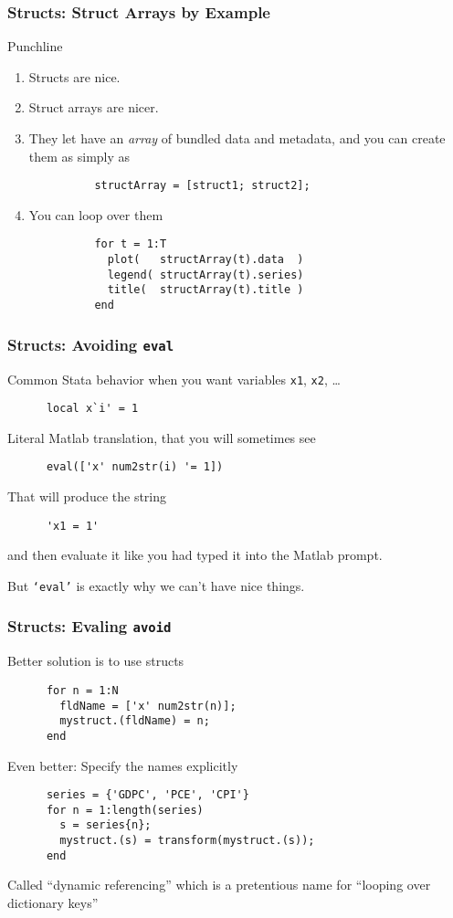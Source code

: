 \documentclass{beamer}
\begin{document}
  \begin{frame}[fragile]
    \frametitle{Structs: Struct Arrays by Example}

    Punchline
    \begin{enumerate}
      \item Structs are nice.
      \item Struct arrays are nicer.
      \item They let have an \emph{array} of bundled data and metadata,
        and you can create them as simply as
        \begin{lstlisting}
          structArray = [struct1; struct2];
        \end{lstlisting}
      \item You can loop over them
        \begin{lstlisting}
          for t = 1:T
            plot(   structArray(t).data  )
            legend( structArray(t).series)
            title(  structArray(t).title )
          end
        \end{lstlisting}
    \end{enumerate}
	\end{frame}

  \begin{frame}[fragile]
    \frametitle{Structs: Avoiding \texttt{eval}}

    Common Stata behavior when you want variables \texttt{x1},
    \texttt{x2}, \ldots
    \begin{lstlisting}
      local x`i' = 1
    \end{lstlisting}\pause
    Literal Matlab translation, that you will sometimes see
    \begin{lstlisting}
      eval(['x' num2str(i) '= 1])
    \end{lstlisting}\pause
    That will produce the string
    \begin{lstlisting}
      'x1 = 1'
    \end{lstlisting}
    and then evaluate it like you had typed it into the Matlab prompt.\pause

    \vspace{20pt}
    But \texttt{`eval'} is exactly why we can't have nice things.
	\end{frame}


  \begin{frame}[fragile]
    \frametitle{Structs: Evaling \texttt{avoid}}

    Better solution is to use structs
    \begin{lstlisting}
      for n = 1:N
        fldName = ['x' num2str(n)];
        mystruct.(fldName) = n;
      end
    \end{lstlisting}\pause
    Even better: Specify the names explicitly
    \begin{lstlisting}
      series = {'GDPC', 'PCE', 'CPI'}
      for n = 1:length(series)
        s = series{n};
        mystruct.(s) = transform(mystruct.(s));
      end
    \end{lstlisting}\pause
    Called ``dynamic referencing'' which is a pretentious name for
    ``looping over dictionary keys''
	\end{frame}
\end{document}

